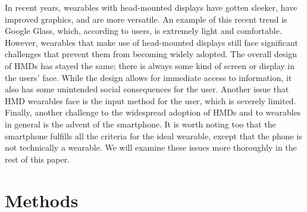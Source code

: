 \documentclass[11pt]{article}
\begin{document}
In recent years, wearables with head-mounted displays have gotten sleeker, have improved graphics, and are more versatile. An example of this recent trend is Google Glass, which, according to users, is extremely light and comfortable. However, wearables that make use of head-mounted displays still face significant challenges that prevent them from becoming widely adopted. The overall design of HMDs has stayed the same; there is always some kind of screen or display in the users' face. While the design allows for immediate access to information, it also has some unintended social consequences for the user. Another issue that HMD wearables face is the input method for the user, which is severely limited. Finally, another challenge to the widespread adoption of HMDs and to wearables in general is the advent of the smartphone. It is worth noting too that the smartphone fulfills all the criteria for the ideal wearable, except that the phone is not technically a wearable. We will examine these issues more thoroughly in the rest of this paper.
\section{Methods}
\end{document}
